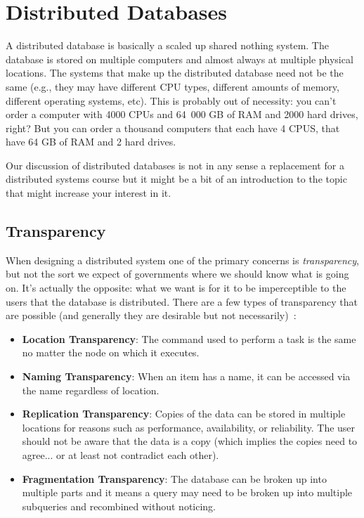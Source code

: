\documentclass[a4paper]{report}
\begin{document}
\section*{Distributed Databases}

A distributed database is basically a scaled up shared nothing system. The database is stored on multiple computers and almost always at multiple physical locations. The systems that make up the distributed database need not be the same (e.g., they may have different CPU types, different amounts of memory, different operating systems, etc). This is probably out of necessity: you can't order a computer with 4000 CPUs and 64~000 GB of RAM and 2000 hard drives, right? But you can order a thousand computers that each have 4 CPUS, that have 64 GB of RAM and 2 hard drives.

Our discussion of distributed databases is not in any sense a replacement for a distributed systems course but it might be a bit of an introduction to the topic that might increase your interest in it. 


\subsection*{Transparency}
When designing a distributed system one of the primary concerns is \textit{transparency}, but not the sort we expect of governments where we should know what is going on. It's actually the opposite: what we want is for it to be imperceptible to the users that the database is distributed. There are a few types of transparency that are possible (and generally they are desirable but not necessarily)~\cite{fds}:

\begin{itemize}
	\item \textbf{Location Transparency}: The command used to perform a task is the same no matter the node on which it executes.
	\item \textbf{Naming Transparency}: When an item has a name, it can be accessed via the name regardless of location.
	\item \textbf{Replication Transparency}: Copies of the data can be stored in multiple locations for reasons such as performance, availability, or reliability. The user should not be aware that the data is a copy (which implies the copies need to agree... or at least not contradict each other).
	\item \textbf{Fragmentation Transparency}: The database can be broken up into multiple parts and it means a query may need to be broken up into multiple subqueries and recombined without noticing. 
\end{itemize}
\end{document}
